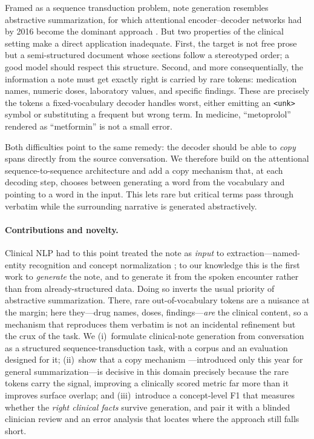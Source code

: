 \documentclass{article}
\begin{document}
Framed as a sequence transduction problem, note generation resembles abstractive
summarization, for which attentional encoder--decoder networks had by 2016 become
the dominant approach \citep{Bahdanau2015,Rush2015,Nallapati2016}. But two
properties of the clinical setting make a direct application inadequate. First, the
target is not free prose but a semi-structured document whose sections follow a
stereotyped order; a good model should respect this structure. Second, and more
consequentially, the information a note must get exactly right is carried by rare
tokens: medication names, numeric doses, laboratory values, and specific findings.
These are precisely the tokens a fixed-vocabulary decoder handles worst, either
emitting an \texttt{<unk>} symbol or substituting a frequent but wrong term. In
medicine, ``metoprolol'' rendered as ``metformin'' is not a small error.

Both difficulties point to the same remedy: the decoder should be able to
\emph{copy} spans directly from the source conversation. We therefore build on the
attentional sequence-to-sequence architecture and add a copy mechanism
\citep{Gu2016,Gulcehre2016} that, at each decoding step, chooses between generating
a word from the vocabulary and pointing to a word in the input. This lets rare but
critical terms pass through verbatim while the surrounding narrative is generated
abstractively.

\paragraph{Contributions and novelty.} Clinical NLP had to this point treated the note
as \emph{input} to extraction---named-entity recognition and concept normalization
\citep{Aronson2010,Uzuner2011}; to our knowledge this is the first work to
\emph{generate} the note, and to generate it from the spoken encounter rather than
from already-structured data. Doing so inverts the usual priority of abstractive
summarization. There, rare out-of-vocabulary tokens are a nuisance at the margin;
here they---drug names, doses, findings---\emph{are} the clinical content, so a
mechanism that reproduces them verbatim is not an incidental refinement but the crux
of the task. We (i)~formulate clinical-note generation from conversation as a
structured sequence-transduction task, with a corpus and an evaluation designed for
it; (ii)~show that a copy mechanism \citep{Gu2016,Gulcehre2016}---introduced only this
year for general summarization---is decisive in this domain precisely because the rare
tokens carry the signal, improving a clinically scored metric far more than it
improves surface overlap; and (iii)~introduce a concept-level F1 that measures whether
the \emph{right clinical facts} survive generation, and pair it with a blinded
clinician review and an error analysis that locates where the approach still falls
short.
\end{document}
